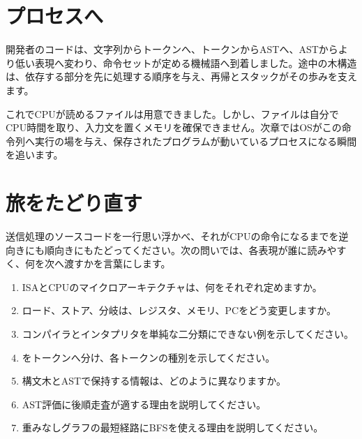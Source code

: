 \par
\endgroup
\par
\endgroup


\section{プロセスへ}
\label{sec:02-language-15}

開発者のコードは、文字列からトークンへ、トークンからASTへ、ASTからより低い表現へ変わり、命令セットが定める機械語へ到着しました。途中の木構造は、依存する部分を先に処理する順序を与え、再帰とスタックがその歩みを支えます。

これでCPUが読めるファイルは用意できました。しかし、ファイルは自分でCPU時間を取り、入力文を置くメモリを確保できません。次章ではOSがこの命令列へ実行の場を与え、保存されたプログラムが動いているプロセスになる瞬間を追います。



\section{旅をたどり直す}
\label{sec:02-language-16}

送信処理のソースコードを一行思い浮かべ、それがCPUの命令になるまでを逆向きにも順向きにもたどってください。次の問いでは、各表現が誰に読みやすく、何を次へ渡すかを言葉にします。

\begingroup
  \begin{enumerate}
    \item ISAとCPUのマイクロアーキテクチャは、何をそれぞれ定めますか。
    \item ロード、ストア、分岐は、レジスタ、メモリ、PCをどう変更しますか。
    \item コンパイラとインタプリタを単純な二分類にできない例を示してください。
    \item {} をトークンへ分け、各トークンの種別を示してください。
    \item 構文木とASTで保持する情報は、どのように異なりますか。
    \item AST評価に後順走査が適する理由を説明してください。
    \item 重みなしグラフの最短経路にBFSを使える理由を説明してください。
  \end{enumerate}
\par
\endgroup



